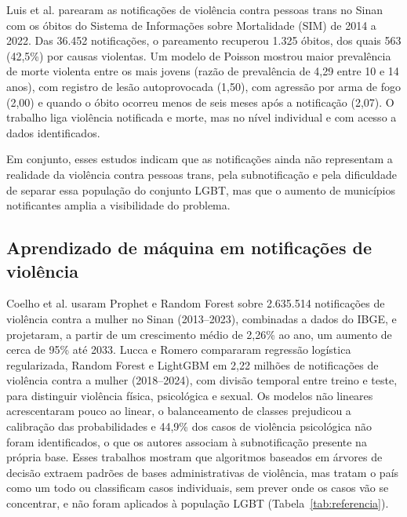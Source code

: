 \documentclass[12pt]{article}
\begin{document}
Luis et al. \cite{luis:2025} parearam as notificações de violência contra pessoas trans no Sinan com os óbitos do Sistema de Informações sobre Mortalidade (SIM) de 2014 a 2022. Das 36.452 notificações, o pareamento recuperou 1.325 óbitos, dos quais 563 (42,5\%) por causas violentas. Um modelo de Poisson mostrou maior prevalência de morte violenta entre os mais jovens (razão de prevalência de 4,29 entre 10 e 14 anos), com registro de lesão autoprovocada (1,50), com agressão por arma de fogo (2,00) e quando o óbito ocorreu menos de seis meses após a notificação (2,07). O trabalho liga violência notificada e morte, mas no nível individual e com acesso a dados identificados.

Em conjunto, esses estudos indicam que as notificações ainda não representam a realidade da violência contra pessoas trans, pela subnotificação e pela dificuldade de separar essa população do conjunto LGBT, mas que o aumento de municípios notificantes amplia a visibilidade do problema.

\subsection{Aprendizado de máquina em notificações de violência}

Coelho et al. \cite{coelho_jiv:2025} usaram Prophet e Random Forest sobre 2.635.514 notificações de violência contra a mulher no Sinan (2013--2023), combinadas a dados do IBGE, e projetaram, a partir de um crescimento médio de 2,26\% ao ano, um aumento de cerca de 95\% até 2033. Lucca e Romero \cite{lucca_romero_sbbd:2026} compararam regressão logística regularizada, Random Forest e LightGBM em 2,22 milhões de notificações de violência contra a mulher (2018--2024), com divisão temporal entre treino e teste, para distinguir violência física, psicológica e sexual. Os modelos não lineares acrescentaram pouco ao linear, o balanceamento de classes prejudicou a calibração das probabilidades e 44,9\% dos casos de violência psicológica não foram identificados, o que os autores associam à subnotificação presente na própria base. Esses trabalhos mostram que algoritmos baseados em árvores de decisão extraem padrões de bases administrativas de violência, mas tratam o país como um todo ou classificam casos individuais, sem prever onde os casos vão se concentrar, e não foram aplicados à população LGBT (Tabela~\ref{tab:referencia}).
\end{document}
